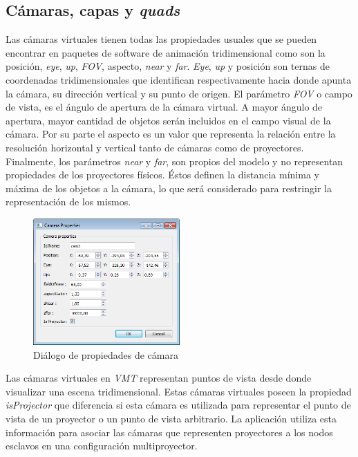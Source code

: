 \subsection{Cámaras, capas y \emph{quads}}
Las cámaras virtuales tienen todas las propiedades usuales que se pueden encontrar en paquetes de software de animación tridimensional como son la posición, \emph{eye}, \emph{up}, \emph{FOV}, aspecto, \emph{near} y \emph{far}.
\emph{Eye}, \emph{up} y posición son ternas de coordenadas tridimensionales que identifican respectivamente hacia donde apunta la cámara, su dirección vertical y su punto de origen.
El parámetro \emph{FOV} o campo de vista, es el ángulo de apertura de la cámara virtual. A mayor ángulo de apertura, mayor cantidad de objetos serán incluidos en el campo visual de la cámara.
Por su parte el aspecto es un valor que representa la relación entre la resolución horizontal y vertical tanto de cámaras como de proyectores.
Finalmente, los parámetros \emph{near} y \emph{far}, son propios del modelo y no representan propiedades de los proyectores físicos. Éstos definen la distancia mínima y máxima de los objetos a la cámara, lo que será considerado para restringir la representación de los mismos.

\begin{figure}[H]
  \centering
    \includegraphics[width=0.5\textwidth]{./Cap5_vmt/vmt_cameraProperties.png}
  \caption[Imagen propia.]{Diálogo de propiedades de cámara}
  \label{fig:VMT-CameraProperties}
\end{figure}

Las cámaras virtuales en \emph{VMT} representan puntos de vista desde donde visualizar una escena tridimensional. Estas cámaras virtuales poseen la propiedad \emph{isProjector} que diferencia si esta cámara es utilizada para representar el punto de vista de un proyector o un punto de vista arbitrario. La aplicación utiliza esta información para asociar las cámaras que representen proyectores a los nodos esclavos en una configuración multiproyector.

